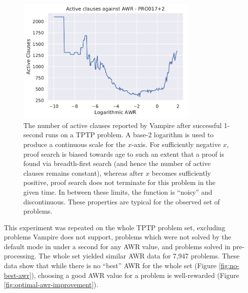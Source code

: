 \documentclass{llncs}
\begin{document}
\begin{figure}
	\centering
	\includegraphics[width=0.8\textwidth]{example-optimal-awr}
	\caption{
The number of active clauses reported by Vampire after successful 1-second runs on a TPTP problem.
A base-2 logarithm is used to produce a continuous scale for the \(x\)-axis.
For sufficiently negative \(x\), proof search is biased towards age to such an extent that a proof is found via breadth-first search (and hence the number of active clauses remains constant), whereas after \(x\) becomes sufficiently positive, proof search does not terminate for this problem in the given time.
In between these limits, the function is ``noisy'' and discontinuous.
These properties are typical for the observed set of problems.
}
	\label{fig:example-optimal-awr}
\end{figure}

This experiment was repeated on the whole TPTP problem set, excluding problems Vampire does not support, problems which were not solved by the default mode in under a second for any AWR value, and problems solved in pre-processing.
The whole set yielded similar AWR data for 7,947 problems.
These data show that while there is no ``best'' AWR for the whole set (Figure \ref{fig:no-best-awr}), choosing a good AWR value for a problem is well-rewarded (Figure \ref{fig:optimal-awr-improvement}).
\end{document}
